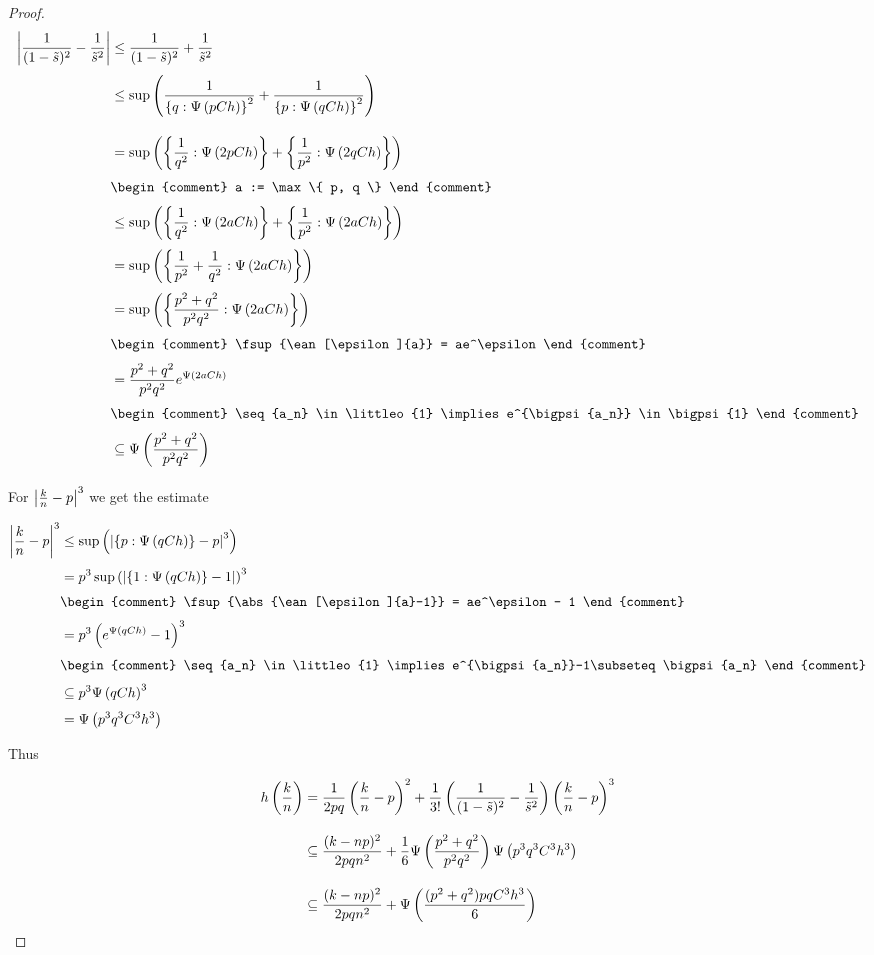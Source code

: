 \begin{proof}
  \begin{align}
    \abs{\frac 1{(1-\tilde s)^2}-\frac 1{\tilde s^2}} & \le \frac{1}{(1-\tilde s)^2} + \frac{1}{\tilde s^2} \nl
    & \le \fsup{\frac 1{\ean[\bigpsi{pCh}]{q}^2} + \frac 1{\ean[\bigpsi{qCh}]{p}^2}} \bnl
    & = \fsup{\ean[\bigpsi{2pCh}]{\frac 1{q^2}} + \ean[\bigpsi{2qCh}]{\frac 1{p^2}}} \nl
    &
    \begin{comment}
      a := \max\{ p, q \}
    \end{comment} \nl
    & \le \fsup{\ean[\bigpsi{2aCh}]{\frac{1}{q^2}} + \ean[\bigpsi{2aCh}]{\frac 1{p^2}}} \nl
    & = \fsup{\ean[\bigpsi{2aCh}]{\frac 1{p^2}+\frac 1{q^2}}} \nl
    & = \fsup{\ean[\bigpsi{2aCh}]{\frac {p^2+q^2}{p^2q^2}}} \nl
    &
    \begin{comment}
      \fsup{\ean[\epsilon]{a}} = ae^\epsilon
    \end{comment} \nl
    & = \frac {p^2+q^2}{p^2q^2} e^{\bigpsi{2aCh}} \nl
    & \begin{comment}
      \seq{a_n} \in \littleo{1} \implies e^{\bigpsi{a_n}} \in \bigpsi{1}
    \end{comment} \nl
    & \subseteq \bigpsi{\frac {p^2+q^2}{p^2q^2}} \nl
  \end{align}

  \noindent For $\left|{\frac kn-p}\right|^3$ we get the estimate

  \begin{align}
    \abs{\frac kn-p}^3 & \le \fsup{\abs{\ean[\bigpsi{qCh}]{p}-p}^3} \nl
    & = p^3 \fsup{\abs{\ean[\bigpsi{qCh}]{1}-1}}^3 \nl
    &
    \begin{comment}
      \fsup{\abs{\ean[\epsilon]{a}-1}} = ae^\epsilon - 1
    \end{comment} \nl
    & = p^3 \left(e^{\bigpsi{qCh}}-1\right)^3 \nl
    &
    \begin{comment}
      \seq{a_n} \in \littleo{1} \implies e^{\bigpsi{a_n}}-1\subseteq \bigpsi{a_n}
    \end{comment} \nl
    & \subseteq p^3 \bigpsi{qCh}^3 \nl
    & = \bigpsi{p^3q^3C^3h^3}
  \end{align}

  \noindent Thus

  \begin{align}
    \h{\frac kn} & = \frac 1{2pq} \left(\frac kn-p\right)^2 + \frac{1}{3!} \left(\frac 1{(1-\tilde s)^2} - \frac 1{\tilde s^2}\right) \left(\frac kn-p\right)^3 \bnl
    & \subseteq \frac{(k-np)^2}{2pqn^2} + \frac {1}{6} \bigpsi{\frac{p^2+q^2}{p^2q^2}} \bigpsi{p^3q^3C^3h^3} \bnl
    & \subseteq \frac{(k-np)^2}{2pqn^2} + \bigpsi{\frac{(p^2+q^2)pqC^3h^3}{6}}
  \end{align}


\end{proof}
